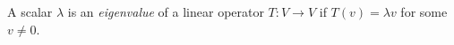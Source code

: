 
A scalar $\lambda$ is an \emph{eigenvalue} of a linear operator $T:V\to V$ if $T(v)=\lambda v$ for some $v\ne0$.

